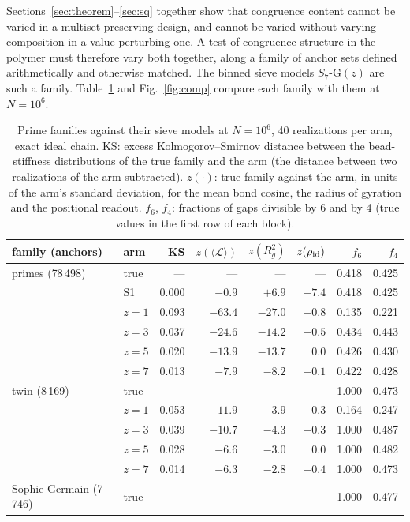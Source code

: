 \documentclass[reprint,amsmath,amssymb,aps,pre,longbibliography]{revtex4-2}
\begin{document}
Sections~\ref{sec:theorem}--\ref{sec:sq} together show that congruence content cannot be varied
in a multiset-preserving design, and cannot be varied without varying composition in a
value-perturbing one. A test of congruence structure in the polymer must therefore vary both
together, along a family of anchor sets defined arithmetically and otherwise matched. The binned
sieve models $S_7$-G$(z)$ are such a family. Table~\ref{tab:comp} and Fig.~\ref{fig:comp} compare
each family with them at $N=10^6$.

\begin{table}[t]
\caption{Prime families against their sieve models at $N=10^6$, 40 realizations per arm, exact
ideal chain. KS: excess Kolmogorov--Smirnov distance between the bead-stiffness distributions of
the true family and the arm (the distance between two realizations of the arm subtracted).
$z(\cdot)$: true family against the arm, in units of the arm's standard deviation, for the mean
bond cosine, the radius of gyration and the positional readout. $f_6$, $f_4$: fractions of
gaps divisible by 6 and by 4 (true values in the first row of each block).}
\label{tab:comp}
\begin{ruledtabular}
\begin{tabular}{llrrrrrr}
family (anchors) & arm & KS & $z(\langle\mathcal L\rangle)$ & $z(R_g^2)$ & $z(\rho_{\rm id})$ & $f_6$ & $f_4$\\ \hline
primes (78\,498) & true & --- & --- & --- & --- & 0.418 & 0.425\\
 & S1 & 0.000 & $-0.9$ & $+6.9$ & $-7.4$ & 0.418 & 0.425\\
 & $z=1$ & 0.093 & $-63.4$ & $-27.0$ & $-0.8$ & 0.135 & 0.221\\
 & $z=3$ & 0.037 & $-24.6$ & $-14.2$ & $-0.5$ & 0.434 & 0.443\\
 & $z=5$ & 0.020 & $-13.9$ & $-13.7$ & $0.0$ & 0.426 & 0.430\\
 & $z=7$ & 0.013 & $-7.9$ & $-8.2$ & $-0.1$ & 0.422 & 0.428\\ \hline
twin (8\,169) & true & --- & --- & --- & --- & 1.000 & 0.473\\
 & $z=1$ & 0.053 & $-11.9$ & $-3.9$ & $-0.3$ & 0.164 & 0.247\\
 & $z=3$ & 0.039 & $-10.7$ & $-4.3$ & $-0.3$ & 1.000 & 0.487\\
 & $z=5$ & 0.028 & $-6.6$ & $-3.0$ & $0.0$ & 1.000 & 0.482\\
 & $z=7$ & 0.014 & $-6.3$ & $-2.8$ & $-0.4$ & 1.000 & 0.473\\ \hline
Sophie Germain (7\,746) & true & --- & --- & --- & --- & 1.000 & 0.477\\

\end{tabular}
\end{ruledtabular}
\end{table}
\end{document}
